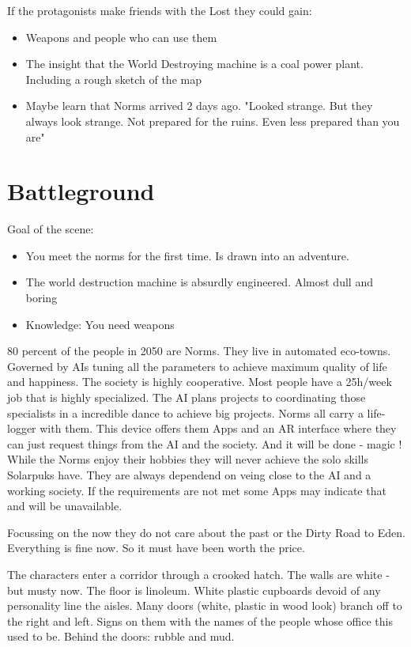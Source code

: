 If the protagonists make friends with the Lost they could gain:

\begin{itemize}
    \item Weapons and people who can use them
    \item The insight that the World Destroying machine is a coal power plant. Including a rough sketch of the map
    \item Maybe learn that Norms arrived 2 days ago. "Looked strange. But they always look strange. Not prepared for the ruins. Even less prepared than you are"
\end{itemize}

\section{Battleground}
Goal of the scene:
\begin{itemize}
\item You meet the norms for the first time. Is drawn into an adventure.
\item The world destruction machine is absurdly engineered. Almost dull and boring
\item Knowledge: You need weapons
\end{itemize}

\begin{sidebarBox}[title=Norms]

80 percent of the people in 2050 are Norms. They live in automated eco-towns. Governed by AIs tuning all the parameters to achieve maximum quality of life and happiness. The society is highly cooperative. Most people have a 25h/week job that is highly specialized. The AI plans projects to coordinating those specialists in a incredible dance to achieve big projects.
Norms all carry a life-logger with them. This device offers them Apps and an AR interface where they can just request things from the AI and the society. And it will be done - magic !
While the Norms enjoy their hobbies they will never achieve the solo skills Solarpuks have. They are always dependend on veing close to the AI and a working society. If the requirements are not met some Apps may indicate that and will be unavailable.

Focussing on the now they do not care about the past or the Dirty Road to Eden. Everything is fine now. So it must have been worth the price.

\end{sidebarBox}

The characters enter a corridor through a crooked hatch. The walls are white - but musty now. The floor is linoleum.
White plastic cupboards devoid of any personality line the aisles. Many doors (white, plastic in wood look) branch off
to the right and left. Signs on them with the names of the people whose office this used to be. Behind the doors:
rubble and mud.


